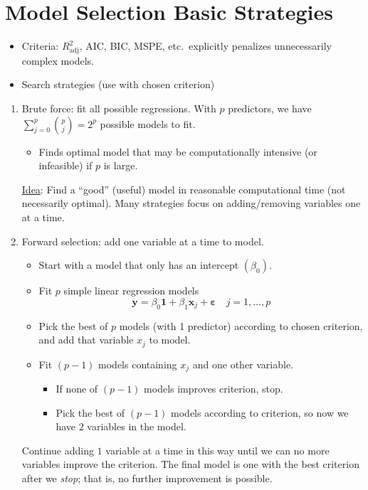 \section{Model Selection Basic Strategies}
\begin{itemize}
      \item Criteria: $ R^2_{\text{adj}} $, AIC, BIC,
            MSPE, etc.\ explicitly penalizes unnecessarily
            complex models.
      \item Search strategies (use with chosen
            criterion)
\end{itemize}
\begin{enumerate}[label=(\roman*)]
      \item Brute force: fit all possible regressions.
            With $ p $ predictors, we have
            $ \sum_{j=0}^{p} \binom{p}{j}=2^p $ possible models to fit.
            \begin{itemize}
                  \item Finds optimal model that may be computationally
                        intensive (or infeasible) if $ p $ is large.
            \end{itemize}

            \underline{Idea}: Find a ``good'' (useful)
            model in reasonable computational time (not necessarily optimal).
            Many strategies focus on adding/removing variables one at a time.
      \item Forward selection: add one variable at a time to model.
            \begin{itemize}
                  \item Start with a model that only has an intercept $ (\beta_0) $.
                  \item Fit $ p $ simple linear regression models
                        \[ \symbf{y}=\beta_0 \symbf{1}+\beta_1\symbf{x}_j
                              +\symbf{\varepsilon}\quad j=1,\ldots,p \]
                  \item Pick the best of $ p $ models (with 1 predictor)
                        according to chosen criterion, and add that variable
                        $ x_j $ to model.
                  \item Fit $ (p-1) $ models containing $ x_j $
                        and one other variable.
                        \begin{itemize}
                              \item If none of $ (p-1) $ models improves
                                    criterion, stop.
                              \item Pick the best of $ (p-1) $ models according
                                    to criterion, so now we have $ 2 $ variables in the model.
                        \end{itemize}
            \end{itemize}
            Continue adding $ 1 $ variable at a time in this way until
            we can no more variables improve the criterion. The final
            model is one with the best criterion after we \emph{stop};
            that is, no further improvement is possible.


\end{enumerate}
